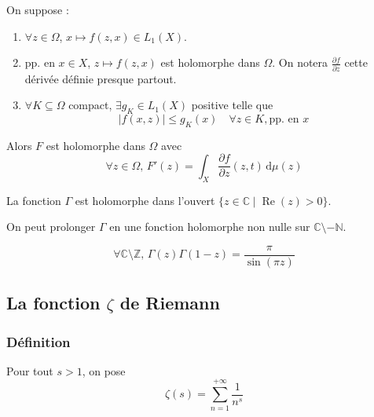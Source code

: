 	\begin{theorem}
		On suppose :
		\begin{enumerate}[label=(\roman*)]
			\item $\forall z \in \Omega$, $x \mapsto f(z,x) \in L_1(X)$.
			\item pp. en $x \in X$, $z \mapsto f(z,x)$ est holomorphe dans $\Omega$. On notera $\frac{\partial f}{\partial z}$ cette dérivée définie presque partout.
			\item $\forall K \subseteq \Omega$ compact, $\exists g_K \in L_1(X)$ positive telle que
			\[ \left| f(x,z) \right| \leq g_K(x) \quad \forall z \in K, \text{pp. en } x \]
		\end{enumerate}
		Alors $F$ est holomorphe dans $\Omega$ avec
		\[ \forall z \in \Omega, \, F'(z) = \int_X \frac{\partial f}{\partial z}(z, t) \, \mathrm{d}\mu(z) \]
	\end{theorem}
	
	
	\begin{example}
		La fonction $\Gamma$ est holomorphe dans l'ouvert $\{ z \in \mathbb{C} \mid \operatorname{Re}(z) > 0 \}$.
	\end{example}
	
	\begin{theorem}
		On peut prolonger $\Gamma$ en une fonction holomorphe non nulle sur $\mathbb{C} \setminus -\mathbb{N}$.
	\end{theorem}
	
	
	\begin{theorem}
		\[ \forall \mathbb{C} \setminus \mathbb{Z}, \, \Gamma(z) \Gamma(1-z) = \frac{\pi}{\sin(\pi z)} \]
	\end{theorem}
	
	\subsection{La fonction \texorpdfstring{$\zeta$}{Zeta} de Riemann}
	
	\subsubsection{Définition}
	
	
	\begin{definition}
		\label{244-6}
		Pour tout $s > 1$, on pose
		\[ \zeta(s) = \sum_{n=1}^{+\infty} \frac{1}{n^s} \]
	\end{definition}
	
